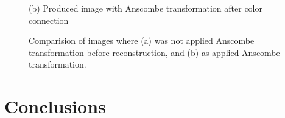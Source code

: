 \documentclass[12pt,a4paper,english
]{tunithesis}
\begin{document}
\begin{figure}[h]
\begin{minipage}[b]{0.45\textwidth}
    \caption*{(b) Produced image with Anscombe transformation after color connection}
  \end{minipage}
  \caption{Comparision of images where (a) was not applied Anscombe transformation before reconstruction, and (b) as applied Anscombe transformation.}
  \label{fig:comparison-white-balance}
\end{figure}


\chapter{Conclusions}
\label{ch:conclusions}
%
%
\newpage

\printbibliography[title=References]
\end{document}
